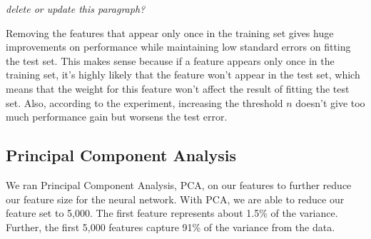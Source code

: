 \documentclass[journal]{IEEEtran}
\begin{document}
\textit{delete or update this paragraph?}
\par Removing the features that
appear only once in the training set gives huge improvements on performance
while maintaining low standard errors on fitting the test set. This makes sense
because if a
feature appears only once in the training set, it's highly likely that the
feature won't appear in the test set, which means that the weight for this feature
won't affect the result of fitting the test set. Also, according to the experiment,
increasing the threshold $n$ doesn't give too much performance gain but worsens
the test error.

\subsection{Principal Component Analysis}
We ran Principal Component Analysis, PCA, on our features to further reduce
our feature size for the neural network. With PCA, we
are able to reduce our feature set to 5,000.  The first feature
represents about 1.5\% of the variance.  Further, the first 5,000 features
capture 91\% of the variance from the data.
\\
\\
\end{document}

